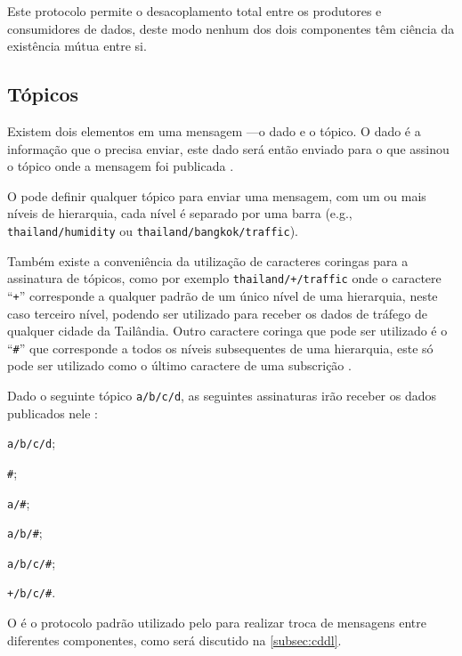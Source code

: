 Este protocolo permite o desacoplamento total entre os produtores e consumidores de dados, deste modo nenhum dos dois componentes têm ciência da existência mútua entre si.

\subsection{Tópicos \mqtt} \label{subsec:mqtt-topics}

Existem dois elementos em uma mensagem \mqtt---o dado e o tópico. O dado é a informação que o \pub precisa enviar, este dado será então enviado para o \sub que assinou o tópico onde a mensagem foi publicada \cite{tantitharanukul:et-al:2017}.

O \pub pode definir qualquer tópico para enviar uma mensagem, com um ou mais níveis de hierarquia, cada nível é separado por uma barra (e.g., \texttt{thailand/humidity} ou \texttt{thailand/bangkok/traffic}).

Também existe a conveniência da utilização de caracteres coringas para a assinatura de tópicos, como por exemplo \texttt{thailand/+/traffic} onde o caractere ``\texttt{+}'' corresponde a qualquer padrão de um único nível de uma hierarquia, neste caso terceiro nível, podendo ser utilizado para receber os dados de tráfego de qualquer cidade da Tailândia. Outro caractere coringa que pode ser utilizado é o ``\texttt{\#}'' que corresponde a todos os níveis subsequentes de uma hierarquia, este só pode ser utilizado como o último caractere de uma subscrição \cite{hunkeler:truong:stanford-clark:2008}.

Dado o seguinte tópico \texttt{a/b/c/d}, as seguintes assinaturas irão receber os dados publicados nele \cite{light:mosquitto}:

\begin{alineas}
	\item \texttt{a/b/c/d};
	\item \texttt{\#};
	\item \texttt{a/\#};
	\item \texttt{a/b/\#};
	\item \texttt{a/b/c/\#};
	\item \texttt{+/b/c/\#}.
\end{alineas}

O \mqtt é o protocolo padrão utilizado pelo \cddl para realizar troca de mensagens entre diferentes componentes, como será discutido na \autoref{subsec:cddl}.
		
\section{\mhubcddl}


